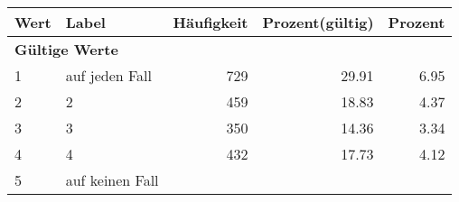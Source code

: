      \begin{longtable}{lXrrr}
     \toprule
     \textbf{Wert} & \textbf{Label} & \textbf{Häufigkeit} & \textbf{Prozent(gültig)} & \textbf{Prozent} \\
     \endhead
     \midrule
     \multicolumn{5}{l}{\textbf{Gültige Werte}}\\

     1 &
     \multicolumn{1}{X}{ auf jeden Fall   } &


       \num{729} &
       \num[round-mode=places,round-precision=2]{29.91} &
         \num[round-mode=places,round-precision=2]{6.95} \\

     2 &
     \multicolumn{1}{X}{ 2   } &


       \num{459} &
       \num[round-mode=places,round-precision=2]{18.83} &
         \num[round-mode=places,round-precision=2]{4.37} \\

     3 &
     \multicolumn{1}{X}{ 3   } &


       \num{350} &
       \num[round-mode=places,round-precision=2]{14.36} &
         \num[round-mode=places,round-precision=2]{3.34} \\

     4 &
     \multicolumn{1}{X}{ 4   } &


       \num{432} &
       \num[round-mode=places,round-precision=2]{17.73} &
         \num[round-mode=places,round-precision=2]{4.12} \\

     5 &
     \multicolumn{1}{X}{ auf keinen Fall   } &



\end{longtable}
